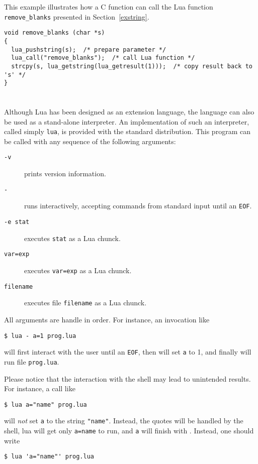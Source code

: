 This example illustrates how a C function can call the Lua function
\verb'remove_blanks' presented in Section~\ref{exstring}.
\begin{verbatim}
void remove_blanks (char *s)
{
  lua_pushstring(s);  /* prepare parameter */
  lua_call("remove_blanks");  /* call Lua function */
  strcpy(s, lua_getstring(lua_getresult(1)));  /* copy result back to 's' */
}
\end{verbatim}


\section{}

Although Lua has been designed as an extension language,
the language can also be used as a stand-alone interpreter.
An implementation of such an interpreter,
called simply \verb|lua|,
is provided with the standard distribution.
This program can be called with any sequence of the following arguments:
\begin{description}
\item[{\tt -v}] prints version information.
\item[{\tt -}] runs interactively, accepting commands from standard input
until an \verb|EOF|.
\item[{\tt -e stat}] executes \verb|stat| as a Lua chunck.
\item[{\tt var=exp}] executes \verb|var=exp| as a Lua chunck.
\item[{\tt filename}] executes file \verb|filename| as a Lua chunck.
\end{description}
All arguments are handle in order.
For instance, an invocation like
\begin{verbatim}
$ lua - a=1 prog.lua
\end{verbatim}
will first interact with the user until an \verb|EOF|,
then will set \verb'a' to 1,
and finally will run file \verb'prog.lua'.

Please notice that the interaction with the shell may lead to
unintended results.
For instance, a call like
\begin{verbatim}
$ lua a="name" prog.lua
\end{verbatim}
will {\em not} set \verb|a| to the string \verb|"name"|.
Instead, the quotes will be handled by the shell,
lua will get only \verb'a=name' to run,
and \verb'a' will finish with \nil.
Instead, one should write
\begin{verbatim}
$ lua 'a="name"' prog.lua
\end{verbatim}

